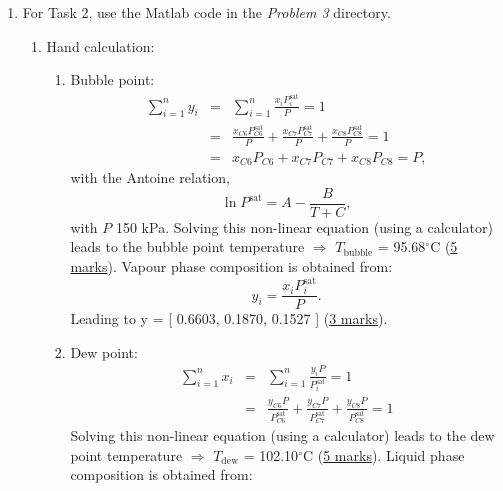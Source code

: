 \documentclass[12pts,a4paper,amsmath,amssymb,floatfix]{article}%
\newcommand{\frc}{\displaystyle\frac}
\begin{document}
\begin{enumerate}[label=\bfseries Problem \arabic*:]
\clearpage
%
   \item For Task 2, use the Matlab code in the {\it Problem 3} directory.
      \begin{enumerate}[label=\bfseries Task \arabic*:]
%
         \item Hand calculation:
            \begin{enumerate}
               \item Bubble point:
                    \begin{eqnarray}
                        \sum\limits_{i=1}^{n} y_{i} &=& \sum\limits_{i=1}^{n} \frc{x_{i}P_{i}^{\text{sat}}}{P} = 1 \nonumber \\
                                                 &=& \frc{x_{C6}P_{C6}^{\text{sat}}}{P} + \frc{x_{C7}P_{C7}^{\text{sat}}}{P} + \frc{x_{C8}P_{C8}^{\text{sat}}}{P} = 1 \nonumber \\
                                                 &=& x_{C6}P_{C6} + x_{C7}P_{C7} + x_{C8}P_{C8} = P, \nonumber 
                    \end{eqnarray}
                    with the Antoine relation,
                      \begin{displaymath}
                         \ln{P^{\text{sat}}} = A - \frc{B}{T+C},
                      \end{displaymath}
                     with $P$ 150 kPa. Solving this non-linear equation (using a calculator) leads to the bubble point temperature $\Longrightarrow$ $T_{\text{bubble}}$ = 95.68$^{\circ}$C (\underline{5 marks}).  Vapour phase composition is obtained from:
                      \begin{displaymath}
                         y_{i} = \frc{x_{i}P_{i}^{\text{sat}}}{P}.
                      \end{displaymath}
                      Leading to y = [ 0.6603, 0.1870, 0.1527 ] (\underline{3 marks}).
%
               \item Dew point:
                    \begin{eqnarray}
                        \sum\limits_{i=1}^{n} x_{i} &=& \sum\limits_{i=1}^{n} \frc{y_{i}P}{P_{i}^{\text{sat}}} = 1 \nonumber \\
                                                 &=& \frc{y_{C6}P}{P_{C6}^{\text{sat}}} + \frc{y_{C7}P}{P_{C7}^{\text{sat}}} + \frc{y_{C8}P}{P_{C8}^{\text{sat}}} = 1 \nonumber 
                    \end{eqnarray}
                    Solving this non-linear equation (using a calculator) leads to the dew point temperature $\Longrightarrow$ $T_{\text{dew}}$ = 102.10$^{\circ}$C (\underline{5 marks}).  Liquid phase composition is obtained from:

\end{enumerate}
\end{enumerate}
\end{enumerate}
\end{document}
